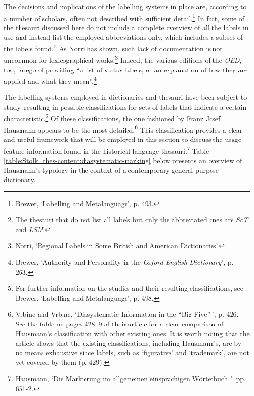 The decisions and implications of the labelling systems in place are, according to a number of scholars, often not described with sufficient detail.\footnote{Brewer, `Labelling and Metalanguage', %
p. 493.} In fact, some of the thesauri discussed here do not include a complete overview of all the labels in use and instead list the employed abbreviations only, which includes a subset of the labels found.\footnote{The thesauri that do not list all labels but only the abbreviated ones are \textit{ScT} and \textit{LSM}.} As Norri has shown, such lack of documentation is not uncommon for lexicographical works.\footnote{Norri, `Regional Labels in Some British and American Dictionaries'.} %
Indeed, the various editions of the \textit{OED}, too, forego of providing ``a list of status labels, or an explanation of how they are applied and what they mean''.\footnote{Brewer, `Authority and Personality in the \textit{Oxford English Dictionary}', %
p. 263.}

The labelling systems employed in dictionaries and thesauri have been subject to study, resulting in possible classifications for sets of labels that indicate a certain characteristic.\footnote{For further information on the studies and their resulting classifications, see Brewer, `Labelling and Metalanguage', p. 498.} Of these classifications, the one fashioned by Franz Josef Hausmann appears to be the most detailed.\footnote{Vrbinc and Vrbinc, `Diasystematic Information in the ``Big Five''%
', %
p. 426. See the table on pages 428–9 of their article for a clear comparison of Hausmann's classification with other existing ones. It is worth noting that the article shows that the existing classifications, including Hausmann's, are by no means exhaustive since labels, such as `figurative' and `trademark', are not yet covered by them (p. 429).} This classification provides a clear and useful framework that will be employed in this section to discuss the usage feature information found in the historical language thesauri.\footnote{Hausmann, `Die Markierung im allgemeinen einsprachigen Wörterbuch%
', %
pp. 651-2.} Table \ref{table:Stolk_thes-content:diasystematic-marking} below presents an overview of Hausmann's typology in the context of a contemporary general-purpose dictionary. 

